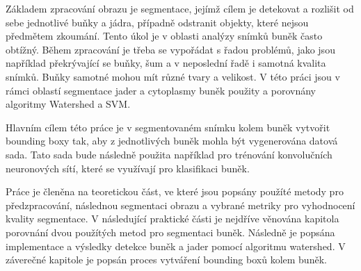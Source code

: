 Základem zpracování obrazu je segmentace, jejímž cílem je detekovat a rozlišit od sebe jednotlivé buňky a jádra, případně odstranit objekty, které nejsou předmětem zkoumání.
Tento úkol je v oblasti analýzy snímků buněk často obtížný.
Během zpracování je třeba se vypořádat s řadou problémů, jako jsou například překrývající se buňky, šum a v neposlední řadě i samotná kvalita snímků.
Buňky samotné mohou mít různé tvary a velikost. 
V této práci jsou v rámci oblastí segmentace jader a cytoplasmy buněk použity a porovnány algoritmy Watershed a SVM.

Hlavním cílem této práce je v segmentovaném snímku kolem buněk vytvořit bounding boxy tak, aby z jednotlivých buněk mohla být vygenerována datová sada.
Tato sada bude následně použita například pro trénování konvolučních neuronových sítí, které se využívají pro klasifikaci buněk.

Práce je členěna na teoretickou část, ve které jsou popsány použíté metody pro předzpracování, následnou segmentaci obrazu a vybrané metriky pro vyhodnocení kvality segmentace.
V následující praktické části je nejdříve věnována kapitola porovnání dvou použítých metod pro segmentaci buněk.
Následně je popsána implementace a výsledky detekce buněk a jader pomocí algoritmu watershed.
V záverečné kapitole je popsán proces vytváření bounding boxů kolem buněk.


